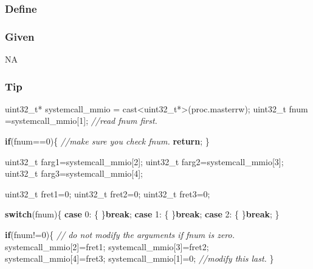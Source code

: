\documentclass[]{book}
\newenvironment{Shaded}{}{}
\newcommand{\KeywordTok}[1]{\textbf{{#1}}}
\newcommand{\DataTypeTok}[1]{\textcolor[rgb]{0.50,0.00,0.00}{{#1}}}
\newcommand{\DecValTok}[1]{\textcolor[rgb]{0.00,0.00,1.00}{{#1}}}
\newcommand{\CommentTok}[1]{\textcolor[rgb]{0.50,0.50,0.50}{\textit{{#1}}}}
\newcommand{\NormalTok}[1]{{#1}}
\begin{document}
\subsubsection*{Define}\label{define-12}

\subsubsection*{Given}\label{given-12}

NA

\subsubsection*{Tip}\label{tip-12}

\begin{Shaded}
\begin{Highlighting}[]
  \DataTypeTok{uint32_t}\NormalTok{* systemcall_mmio = cast<}\DataTypeTok{uint32_t}\NormalTok{*>(proc.masterrw);}
  \DataTypeTok{uint32_t} \NormalTok{fnum =systemcall_mmio[}\DecValTok{1}\NormalTok{];  }\CommentTok{//read fnum first.}

  \KeywordTok{if}\NormalTok{(fnum==}\DecValTok{0}\NormalTok{)\{ }\CommentTok{//make sure you check fnum.}
    \KeywordTok{return}\NormalTok{;}
  \NormalTok{\}}

  \DataTypeTok{uint32_t} \NormalTok{farg1=systemcall_mmio[}\DecValTok{2}\NormalTok{];}
  \DataTypeTok{uint32_t} \NormalTok{farg2=systemcall_mmio[}\DecValTok{3}\NormalTok{];}
  \DataTypeTok{uint32_t} \NormalTok{farg3=systemcall_mmio[}\DecValTok{4}\NormalTok{];}

  \DataTypeTok{uint32_t} \NormalTok{fret1=}\DecValTok{0}\NormalTok{;}
  \DataTypeTok{uint32_t} \NormalTok{fret2=}\DecValTok{0}\NormalTok{;}
  \DataTypeTok{uint32_t} \NormalTok{fret3=}\DecValTok{0}\NormalTok{;}

  \KeywordTok{switch}\NormalTok{(fnum)\{}
  \KeywordTok{case} \DecValTok{0}\NormalTok{: \{}
          \NormalTok{\}}\KeywordTok{break}\NormalTok{;}
  \KeywordTok{case} \DecValTok{1}\NormalTok{: \{}
          \NormalTok{\}}\KeywordTok{break}\NormalTok{;}
  \KeywordTok{case} \DecValTok{2}\NormalTok{: \{}
          \NormalTok{\}}\KeywordTok{break}\NormalTok{;}
  \NormalTok{\}}


  \KeywordTok{if}\NormalTok{(fnum!=}\DecValTok{0}\NormalTok{)\{}
    \CommentTok{// do not modify the arguments if fnum is zero.}
    \NormalTok{systemcall_mmio[}\DecValTok{2}\NormalTok{]=fret1;}
    \NormalTok{systemcall_mmio[}\DecValTok{3}\NormalTok{]=fret2;}
    \NormalTok{systemcall_mmio[}\DecValTok{4}\NormalTok{]=fret3;}
    \NormalTok{systemcall_mmio[}\DecValTok{1}\NormalTok{]=}\DecValTok{0}\NormalTok{; }\CommentTok{//modify this last.}
  \NormalTok{\}}


\end{Highlighting}
\end{Shaded}
\end{document}
